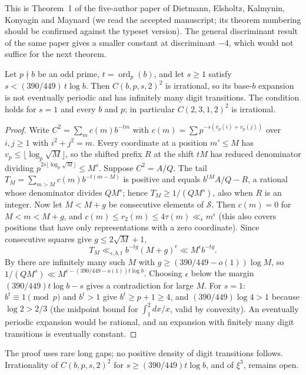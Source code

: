 \documentclass[11pt]{article}
\DeclareMathOperator{\ord}{ord}
\begin{document}
This is Theorem~1 of the five-author paper of Dietmann, Elsholtz, Kalmynin, Konyagin and Maynard (we read the
accepted manuscript; its theorem numbering should be confirmed against the typeset version). The general
discriminant result of the same paper gives a smaller constant at discriminant $-4$, which would not suffice for
the next theorem.

\begin{theorem}\label{thm:squareirr}
Let $p\nmid b$ be an odd prime, $t=\ord_p(b)$, and let $s\ge1$ satisfy $s<(390/449)\,t\log b$. Then $C(b,p,s,2)^2$ is
irrational, so its base-$b$ expansion is not eventually periodic and has infinitely many digit transitions. The
condition holds for $s=1$ and every $b$ and $p$; in particular $C(2,3,1,2)^2$ is irrational.
\end{theorem}

\begin{proof}
Write $C^2=\sum_mc(m)b^{-tm}$ with $c(m)=\sum p^{-s(v_p(i)+v_p(j))}$ over $i,j\ge1$ with $i^2+j^2=m$. Every
coordinate at a position $m'\le M$ has $v_p\le\lfloor\log_p\sqrt M\rfloor$, so the shifted prefix $R$ at the shift
$tM$ has reduced denominator dividing $p^{2s\lfloor\log_p\sqrt M\rfloor}\le M^s$. Suppose $C^2=A/Q$. The tail
$T_M=\sum_{m>M}c(m)b^{-t(m-M)}$ is positive and equals $b^{tM}A/Q-R$, a rational whose denominator divides
$QM^s$; hence $T_M\ge1/(QM^s)$, also when $R$ is an integer. Now let $M<M+g$ be consecutive elements of $\mathcal S$.
Then $c(m)=0$ for $M<m<M+g$, and $c(m)\le r_2(m)\le4\tau(m)\ll_\epsilon m^\epsilon$ (this also covers positions that have
only representations with a zero coordinate). Since consecutive squares give $g\le2\sqrt M+1$,
\[
T_M\ll_{\epsilon,b,t}b^{-tg}(M+g)^\epsilon\ll M^\epsilon b^{-tg}.
\]
By  there are infinitely many such $M$ with $g\ge(390/449-o(1))\log M$, so
$1/(QM^s)\ll M^{\epsilon-(390/449-o(1))t\log b}$. Choosing $\epsilon$ below the margin $(390/449)t\log b-s$ gives a
contradiction for large $M$. For $s=1$: $b^t\equiv1\pmod p$ and $b^t>1$ give $b^t\ge p+1\ge4$, and
$(390/449)\log4>1$ because $\log2>2/3$ (the midpoint bound for $\int_1^2dx/x$, valid by convexity). An eventually
periodic expansion would be rational, and an expansion with finitely many digit transitions is eventually
constant.
\end{proof}

The proof uses rare long gaps; no positive density of digit transitions follows. Irrationality of
$C(b,p,s,2)^2$ for $s\ge(390/449)t\log b$, and of $\xi^3$, remains open.
\end{document}
